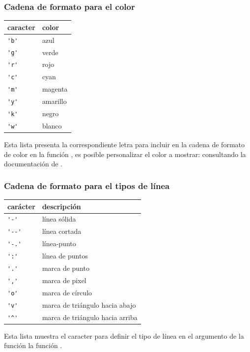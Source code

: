 \begin{frame}[fragile]
\frametitle{Cadena de formato para el color}
\begin{minipage}{0.4\linewidth}
\fontsize{12}{10}\selectfont
\begin{tabular}{l | l}
caracter & color \\ \hline
\verb|'b'| & azul \\ \hline
\verb|'g'| & verde \\ \hline
\verb|'r'| & rojo \\ \hline
\verb|'c'| & cyan \\ \hline
\verb|'m'| & magenta \\ \hline
\verb|'y'| & amarillo \\ \hline
\verb|'k'| & negro \\ \hline
\verb|'w'| & blanco
\end{tabular}
\end{minipage}
\hspace{0.3cm}
\begin{minipage}{0.5\linewidth}
\fontsize{13}{12}\selectfont
Esta lista presenta la correspondiente letra para incluir en la cadena de formato de color en la función , es posible personalizar el color a mostrar: consultando la documentación de .
\end{minipage}
\end{frame}
\begin{frame}[fragile]
\frametitle{Cadena de formato para el tipos de línea}
\begin{minipage}{0.4\linewidth}
\fontsize{10}{10}\selectfont
\begin{tabular}{l | l}
carácter & descripción \\ \hline
\verb|'-'|	& línea sólida \\ \hline
\verb|'--'| & línea cortada \\ \hline
\verb|'-.'| & línea-punto \\ \hline
\verb|':'|	& línea de puntos \\ \hline
\verb|'.'|	& marca de punto \\ \hline
\verb|','|	& marca de pixel \\ \hline
\verb|'o'|	& marca de círculo \\ \hline
\verb|'v'|	& marca de triángulo hacia abajo \\ \hline
\verb|'^'|	& marca de triángulo hacia arriba
\end{tabular}
\end{minipage}
\hspace{0.7cm}
\begin{minipage}{0.5\linewidth}
\fontsize{13}{12}\selectfont
Esta lista muestra el caracter para definir el tipo de línea en el argumento de la función la función .
\end{minipage}
\end{frame}
